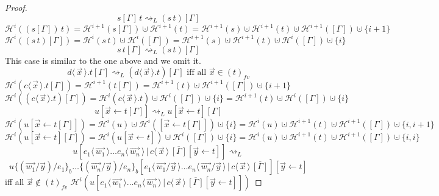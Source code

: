\documentclass[a4paper,UKenglish,cleveref, autoref]{lipics-v2019}
\newcommand{\fv}[1]{(#1)_{fv}}
\newcommand{\set}[1]{ \{ #1 \} }
\newcommand{\app}[2]{#1 \, #2}
\newcommand{\fake}[3]{#1 \langle \, #2 \, \rangle . #3}
\newcommand{\share}[3]{#1 [#2 \leftarrow #3]}
\newcommand{\dist}[5]{#1 [ #2 \, \vert \, \fakedist{#4}{#5} \, #3 ]}
\newcommand{\fakedist}[2]{#1 \langle \, #2 \, \rangle}
\newcommand{\psub}[3]{#1 \{ #2 / #3 \}_{b}}
\newcommand{\height}[2]{\mathcal{H}^{#1}(#2)}
\begin{document}
\begin{proof}
$$\app{s[\Gamma]}{t} \rightsquigarrow_{L} (\app{s}{t})[\Gamma] $$
$\height{i}{\app{(s[\Gamma])}{t}} = \height{i + 1}{s[\Gamma]} \cupdot \height{i + 1}{t} = \height{i + 1}{s} \cupdot \height{i + 1}{t} \cupdot  \height{i + 1}{[\Gamma]} \cupdot \set{i+1}$
\newline
$\height{i}{(\app{s}{t})[\Gamma]} = \height{i}{\app{s}{t}} \cupdot \height{i}{[\Gamma]} = \height{i+ 1}{s} \cupdot \height{i + 1}{t} \cupdot  \height{i}{[\Gamma]} \cupdot \set{i}$
\newline
$$\app{s}{t[\Gamma]} \rightsquigarrow_{L} (\app{s}{t})[\Gamma] $$
This case is similar to the one above and we omit it.
\newline
$$\fake{d}{\vec{x}}{t[\Gamma]} \rightsquigarrow_{L} (\fake{d}{\vec{x}}{t})[\Gamma] \text{ iff all $\vec{x} \in \fv{t}$}$$
$\height{i}{\fake{c}{\vec{x}}{t[\Gamma]}} = \height{i+1}{t[\Gamma]} = \height{i + 1}{t} \cupdot \height{i + 1}{[\Gamma]} \cupdot \set{i + 1}$
\newline
$\height{i}{(\fake{c}{\vec{x}}{t})[\Gamma]} = \height{i}{\fake{c}{\vec{x}}{t}} \cupdot \height{i}{[\Gamma]} \cupdot \set{i} = \height{i + 1}{t} \cupdot \height{i}{[\Gamma]} \cupdot \set{i}$
\newline
$$\share{u}{\vec{x}}{t[\Gamma]} \rightsquigarrow_{L} \share{u}{\vec{x}}{t}[\Gamma] $$
$\height{i}{\share{u}{\vec{x}}{t[\Gamma]}} = \height{i}{u} \cupdot \height{i}{\share{}{\vec{x}}{t[\Gamma]}} \cupdot \set{i} = \height{i}{u} \cupdot \height{i + 1}{t} \cupdot \height{i + 1}{[\Gamma]} \cupdot \set{i, i + 1}$
\newline
$\height{i}{\share{u}{\vec{x}}{t}[\Gamma]} = \height{i}{\share{u}{\vec{x}}{t}} \cupdot \height{i}{[\Gamma]} \cupdot \set{i} = \height{i}{u} \cupdot \height{i + 1}{t} \cupdot \height{i + 1}{[\Gamma]} \cupdot \set{i, i}$
\newline
$$\dist{u}{\fakedist{e_{1}}{\vec{w_{1}}} \dots \fakedist{e_{n}}{\vec{w_{n}}}}{\overline{[\Gamma]} \share{}{\vec{y}}{t}}{c}{\vec{x}} \rightsquigarrow_{L}$$ 
$$\dist{\psub{ \psub{u}{(\vec{w_{1}} / \vec{y})}{e_{1}} \dots}{(\vec{w_{n}} / \vec{y})}{e_{n}}}{\fakedist{e_{1}}{\vec{w_{1}} / \vec{y}} \dots \fakedist{e_{n}}{\vec{w_{n}} / \vec{y}}}{\overline{[\Gamma]}}{c}{\vec{x}} \share{}{\vec{y}}{t}$$
iff all $\vec{x} \not\in \fv{t}$
\newline
$\height{i}{\dist{u}{\fakedist{e_{1}}{\vec{w_{1}}} \dots \fakedist{e_{n}}{\vec{w_{n}}}}{\overline{[\Gamma]} \share{}{\vec{y}}{t}}{c}{\vec{x}}}$ 
\newline

\end{proof}
\end{document}

